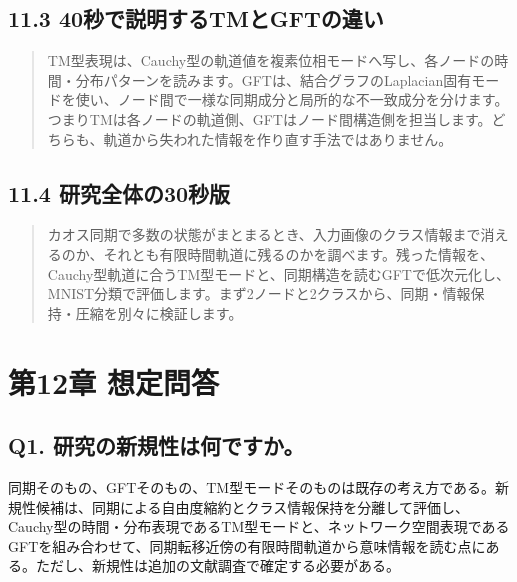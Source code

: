 \documentclass[11pt,a4paper]{ltjsarticle}
\newenvironment{keyquote}{%
  \begin{quote}\color{researchteal}\bfseries\large%
}{%
  \end{quote}%
}
\begin{document}
\subsection*{\textcolor{researchblue}{11.3 40秒で説明するTMとGFTの違い}}

\begin{keyquote}

TM型表現は、Cauchy型の軌道値を複素位相モードへ写し、各ノードの時間・分布パターンを読みます。GFTは、結合グラフのLaplacian固有モードを使い、ノード間で一様な同期成分と局所的な不一致成分を分けます。つまりTMは各ノードの軌道側、GFTはノード間構造側を担当します。どちらも、軌道から失われた情報を作り直す手法ではありません。

\end{keyquote}

\subsection*{\textcolor{researchblue}{11.4 研究全体の30秒版}}

\begin{keyquote}

カオス同期で多数の状態がまとまるとき、入力画像のクラス情報まで消えるのか、それとも有限時間軌道に残るのかを調べます。残った情報を、Cauchy型軌道に合うTM型モードと、同期構造を読むGFTで低次元化し、MNIST分類で評価します。まず2ノードと2クラスから、同期・情報保持・圧縮を別々に検証します。

\end{keyquote}

\goodbreak

\section*{\textcolor{researchink}{第12章 想定問答}}


\subsection*{\textcolor{researchblue}{Q1. 研究の新規性は何ですか。}}

同期そのもの、GFTそのもの、TM型モードそのものは既存の考え方である。新規性候補は、同期による自由度縮約とクラス情報保持を分離して評価し、Cauchy型の時間・分布表現であるTM型モードと、ネットワーク空間表現であるGFTを組み合わせて、同期転移近傍の有限時間軌道から意味情報を読む点にある。ただし、新規性は追加の文献調査で確定する必要がある。\par
\end{document}
